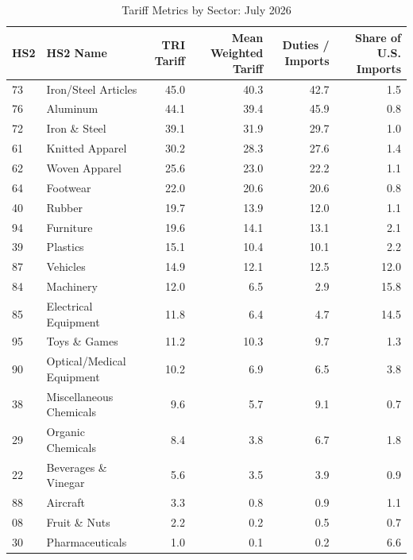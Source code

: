 \begin{table}
\centering
\caption{Tariff Metrics by Sector: July 2026}
\label{tab:tariff_sector}
\begin{tabular}{llrrrr}
\toprule
HS2 & HS2 Name & TRI Tariff & Mean Weighted Tariff & Duties / Imports & Share of U.S. Imports \\
\midrule
73 & Iron/Steel Articles & 45.0 & 40.3 & 42.7 & 1.5 \\
76 & Aluminum & 44.1 & 39.4 & 45.9 & 0.8 \\
72 & Iron \& Steel & 39.1 & 31.9 & 29.7 & 1.0 \\
61 & Knitted Apparel & 30.2 & 28.3 & 27.6 & 1.4 \\
62 & Woven Apparel & 25.6 & 23.0 & 22.2 & 1.1 \\
64 & Footwear & 22.0 & 20.6 & 20.6 & 0.8 \\
40 & Rubber & 19.7 & 13.9 & 12.0 & 1.1 \\
94 & Furniture & 19.6 & 14.1 & 13.1 & 2.1 \\
39 & Plastics & 15.1 & 10.4 & 10.1 & 2.2 \\
87 & Vehicles & 14.9 & 12.1 & 12.5 & 12.0 \\
84 & Machinery & 12.0 & 6.5 & 2.9 & 15.8 \\
85 & Electrical Equipment & 11.8 & 6.4 & 4.7 & 14.5 \\
95 & Toys \& Games & 11.2 & 10.3 & 9.7 & 1.3 \\
90 & Optical/Medical Equipment & 10.2 & 6.9 & 6.5 & 3.8 \\
38 & Miscellaneous Chemicals & 9.6 & 5.7 & 9.1 & 0.7 \\
29 & Organic Chemicals & 8.4 & 3.8 & 6.7 & 1.8 \\
22 & Beverages \& Vinegar & 5.6 & 3.5 & 3.9 & 0.9 \\
88 & Aircraft & 3.3 & 0.8 & 0.9 & 1.1 \\
08 & Fruit \& Nuts & 2.2 & 0.2 & 0.5 & 0.7 \\
30 & Pharmaceuticals & 1.0 & 0.1 & 0.2 & 6.6 \\
\bottomrule
\end{tabular}
\end{table}
